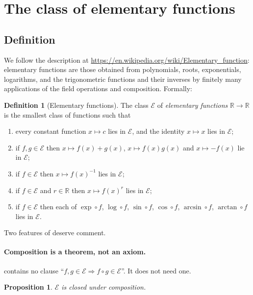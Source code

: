 \documentclass[11pt,oneside]{article}
\newtheorem{proposition}[theorem]{Proposition}
\theoremstyle{definition}
\newtheorem{definition}[theorem]{Definition}
\theoremstyle{remark}
\newcommand{\R}{\mathbb R}
\newcommand{\Elem}{\mathcal E}
\begin{document}
\section{The class of elementary functions}

\subsection{Definition}

We follow the description at
\url{https://en.wikipedia.org/wiki/Elementary_function}: elementary functions
are those obtained from polynomials, roots, exponentials, logarithms, and the
trigonometric functions and their inverses by finitely many applications of
the field operations and composition.  Formally:

\begin{definition}[Elementary functions]\label{def:elem}
The class $\Elem$ of \emph{elementary functions} $\R\to\R$ is the smallest
class of functions such that
\begin{enumerate}
\item every constant function $x\mapsto c$ lies in $\Elem$, and the identity
      $x\mapsto x$ lies in $\Elem$;
\item if $f,g\in\Elem$ then $x\mapsto f(x)+g(x)$, $x\mapsto f(x)g(x)$ and
      $x\mapsto -f(x)$ lie in $\Elem$;
\item if $f\in\Elem$ then $x\mapsto f(x)^{-1}$ lies in $\Elem$;
\item if $f\in\Elem$ and $r\in\R$ then $x\mapsto f(x)^r$ lies in $\Elem$;
\item if $f\in\Elem$ then each of
      $\exp\circ f$, $\log\circ f$, $\sin\circ f$, $\cos\circ f$,
      $\arcsin\circ f$, $\arctan\circ f$ lies in $\Elem$.
\end{enumerate}
\end{definition}

Two features of  deserve comment.

\paragraph{Composition is a theorem, not an axiom.}
 contains no clause ``$f,g\in\Elem\Rightarrow f\circ
g\in\Elem$''.  It does not need one.

\begin{proposition}\label{prop:comp}
$\Elem$ is closed under composition.
\end{proposition}
\end{document}
